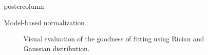 \documentclass[final, size=a0]{beamer}
\begin{document}
\begin{frame}
\begin{columns}
\begin{column}{.33\textwidth}
\begin{beamercolorbox}[center,wd=\textwidth]{postercolumn}
\begin{minipage}[T]{.95\textwidth}
{\begin{alertblock}{Model-based normalization}
              \begin{figure}
                \centering
                \hfill
                \hfill
                \caption{Visual evaluation of the goodness of fitting using Rician and Gaussian distribution.}
                \label{fig:fitting}
              \end{figure}



\end{alertblock}}
\end{minipage}
\end{beamercolorbox}
\end{column}
\end{columns}
\end{frame}
\end{document}
